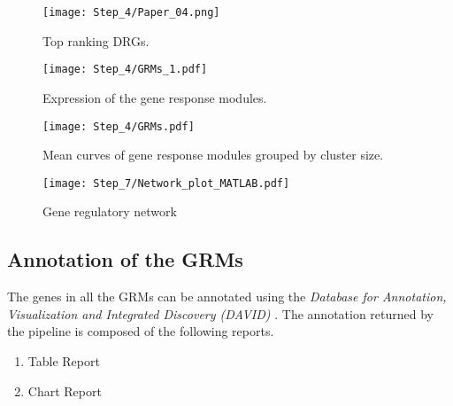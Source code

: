 \begin{figure}
\texttt{[image: Step\_4/Paper\_04.png]}
\caption{Top ranking DRGs.}
\label{figure:drgs}
\end{figure}

\begin{figure}
\texttt{[image: Step\_4/GRMs\_1.pdf]}
\caption{Expression of the gene response modules.}
\label{figure:grms}
\end{figure}

\begin{figure}
\texttt{[image: Step\_4/GRMs.pdf]}
\caption{Mean curves of gene response modules grouped by cluster size.}
\label{figure:grmstype}
\end{figure}

\begin{figure}
\texttt{[image: Step\_7/Network\_plot\_MATLAB.pdf]}
\caption{Gene regulatory network}
\label{fig:generegnet}
\end{figure}


\subsection{Annotation of the GRMs}
\label{section:results2}

The genes in all the GRMs can be annotated using the \textit{Database for Annotation, Visualization and Integrated Discovery (DAVID)} \cite{huang2009systematic,huang2009bioinformatics}. The annotation returned by the pipeline is composed of the following reports.

\begin{enumerate}
\setlength{\itemsep}{-1ex}
   \item Table Report
   \item Chart Report
\end{enumerate}
